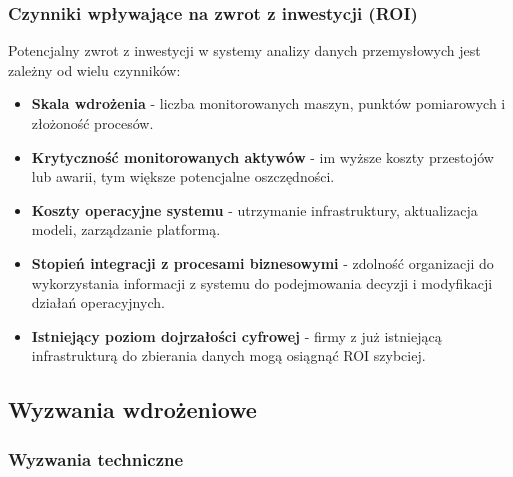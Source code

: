\subsubsection{Czynniki wpływające na zwrot z inwestycji (ROI)}
\label{subsubsec:analiza_roi}

Potencjalny zwrot z inwestycji w systemy analizy danych przemysłowych jest zależny od wielu czynników:

\begin{itemize}
    \item \textbf{Skala wdrożenia} - liczba monitorowanych maszyn, punktów pomiarowych i złożoność procesów.
    \item \textbf{Krytyczność monitorowanych aktywów} - im wyższe koszty przestojów lub awarii, tym większe potencjalne oszczędności.
    \item \textbf{Koszty operacyjne systemu} - utrzymanie infrastruktury, aktualizacja modeli, zarządzanie platformą.
    \item \textbf{Stopień integracji z procesami biznesowymi} - zdolność organizacji do wykorzystania informacji z systemu do podejmowania decyzji i modyfikacji działań operacyjnych.
    \item \textbf{Istniejący poziom dojrzałości cyfrowej} - firmy z już istniejącą infrastrukturą do zbierania danych mogą osiągnąć ROI szybciej.
\end{itemize}


\subsection{Wyzwania wdrożeniowe}
\label{subsec:wyzwania_wdrozeniowe}

\subsubsection{Wyzwania techniczne}
\label{subsubsec:wyzwania_techniczne}

